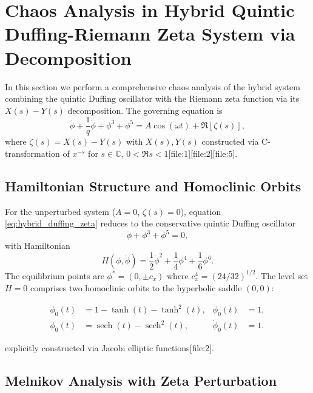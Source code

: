 \documentclass{ws-ijbc}
\begin{document}
\section{Chaos Analysis in Hybrid Quintic Duffing-Riemann Zeta System via Decomposition}

In this section we perform a comprehensive chaos analysis of the hybrid system combining the quintic Duffing oscillator with the Riemann zeta function via its $X(s)-Y(s)$ decomposition. The governing equation is
\begin{equation}
\ddot{\phi}+\frac{1}{q}\dot{\phi}+\phi^3+\phi^5 = A\cos(\omega t) + \Re[\zeta(s)],\label{eq:hybrid_duffing_zeta}
\end{equation}
where $\zeta(s)=X(s)-Y(s)$ with $X(s),Y(s)$ constructed via C-transformation of $x^{-s}$ for $s\in\mathbb{C}$, $0<\Re s<1$[file:1][file:2][file:5].

\subsection{Hamiltonian Structure and Homoclinic Orbits}

For the unperturbed system ($A=0$, $\zeta(s)=0$), equation \eqref{eq:hybrid_duffing_zeta} reduces to the conservative quintic Duffing oscillator
\begin{equation}
\ddot{\phi}+\phi^3+\phi^5=0,\label{eq:unperturbed}
\end{equation}
with Hamiltonian
\begin{equation}
H(\phi,\dot{\phi})=\frac{1}{2}\dot{\phi}^2+\frac{1}{4}\phi^4+\frac{1}{6}\phi^6.
\end{equation}
The equilibrium points are $\phi^\ast=(0,\pm c_x)$ where $c_x^4=(24/32)^{1/2}$. The level set $H=0$ comprises two homoclinic orbits to the hyperbolic saddle $(0,0)$:


\begin{align}
\phi_0(t) &= 1 - \tanh(t) - \tanh^2(t),
& \dot{\phi}_0(t) &= 1, \\
\phi_0(t) &= \operatorname{sech}(t) - \operatorname{sech}^2(t),
& \dot{\phi}_0(t) &= 1.
\end{align}


explicitly constructed via Jacobi elliptic functions[file:2].

\subsection{Melnikov Analysis with Zeta Perturbation}
\end{document}
